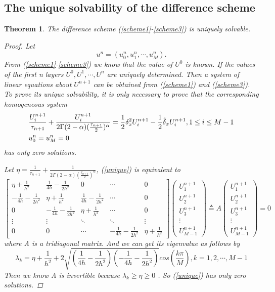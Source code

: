 \documentclass[10pt, reqno]{amsart}
\newtheorem{thm}{\bf Theorem}
\newenvironment{theorem}{\begin{thm}} {\end{thm}}
\theoremstyle{remark}
\theoremstyle{definition}
\numberwithin{table}{section}
\begin{document}
\subsection{The unique solvability of the difference scheme}
\begin{theorem}The difference scheme (\ref{scheme1}-\ref{scheme3}) is uniquely solvable. 
    \begin{proof}
        Let 
        $$
        u^n=(u_0^n, u_1^n, \cdots, u_M^n). 
        $$
        From (\ref{scheme1}-\ref{scheme3}) we know that the value of $U^0$ is known. If the values of the first n layers $U^0, U^1, \cdots, U^{n}$ are uniquely determined. Then a system of linear equations about $U^{n+1}$ can be obtained from (\ref{scheme1}) and (\ref{scheme3}). To prove its unique solvability,  it is only necessary to prove that the corresponding homogeneous system 
        \begin{align}
        &\frac{U_i^{n+1}}{\tau_{n+1}}+\frac{U_i^{n+1}}{2\Gamma(2-\alpha)(\frac{\tau_{n+1}}{2})^\alpha}=\frac{1}{2}\delta_x^2U_i^{n+1}-\frac{1}{2}\tilde{\delta}_xU_i^{n+1}, 1\leq i\leq M-1\notag\\
        &u_0^n=u_M^n=0 \label{unique}
        \end{align}
        has only zero solutions. 

Let $\eta=\frac{1}{\tau_{n+1}}+ \frac{1}{2\Gamma(2-\alpha)(\frac{\tau_{n+1}}{2})^\alpha}$, (\ref{unique}) is equivalent to 
$$
\left[\begin{array}{ccccc}
\eta+\frac{1}{h^2}&\frac{1}{4h}-\frac{1}{2h^2}&0 &\cdots & 0\\
-\frac{1}{4h}-\frac{1}{2h^2} & \eta+\frac{1}{h^2}&\frac{1}{4h}-\frac{1}{2h^2}&\cdots & 0\\
0&-\frac{1}{4h}-\frac{1}{2h^2}&\eta+\frac{1}{h^2}&\cdots&0\\
\vdots & \vdots&\ddots&\ddots & \vdots\\
0&0&\cdots&-\frac{1}{4h}-\frac{1}{2h^2}&\eta+\frac{1}{h^2}
\end{array}
\right]\left(\begin{array}{c}U^{n+1}_1\\
U^{n+1}_2\\
U^{n+1}_3\\
\vdots\\
U^{n+1}_{M-1}
\end{array}\right)\triangleq{}A\left(\begin{array}{c}U^{n+1}_1\\
U^{n+1}_2\\
U^{n+1}_3\\
\vdots\\
U^{n+1}_{M-1}
\end{array}\right)=0
$$
where A is a tridiagonal matrix. And we can get its eigenvalue as follows by \cite{gregory1969}
$$
\lambda_k=\eta+\frac{1}{h^2}+2\sqrt{(\frac{1}{4h}-\frac{1}{2h^2})(-\frac{1}{4h}-\frac{1}{2h^2})}cos(\frac{k\pi}{M}), k=1, 2, \cdots, M-1
$$
Then we know A is invertible because $\lambda_k\geq \eta\geq0$ . So (\ref{unique}) has only zero solutions. 


\end{proof}
\end{theorem}
\end{document}
